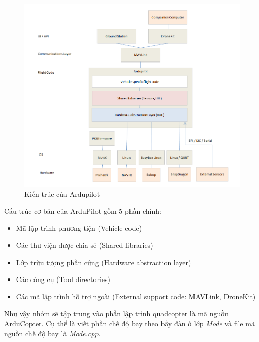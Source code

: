     \begin{figure}[h!]
    	\begin{center}
    		\includegraphics[scale=0.5]{images/ArduPilot_HighLevelArchecture.png}
    		\caption{Kiến trúc của Ardupilot}
    	\end{center}
    \end{figure}

			Cấu trúc cơ bản của ArduPilot gồm 5 phần chính:
			\begin{itemize}
    	\item Mã lập trình phương tiện (Vehicle code)
    	\item Các thư viện được chia sẻ (Shared libraries)
    	\item Lớp trừu tượng phần cứng (Hardware abstraction layer)
    	\item Các công cụ (Tool directories)
    	\item Các mã lập trình hỗ trợ ngoài (External support code: MAVLink, DroneKit)
    		\end{itemize}
    		
    		Như vậy nhóm sẽ tập trung vào phần lập trình quadcopter là mã nguồn ArduCopter. Cụ thể là viết phần chế độ bay theo bầy đàn ở lớp \textit{Mode} và file mã nguồn chế độ bay là \textit{Mode.cpp}.
    		
